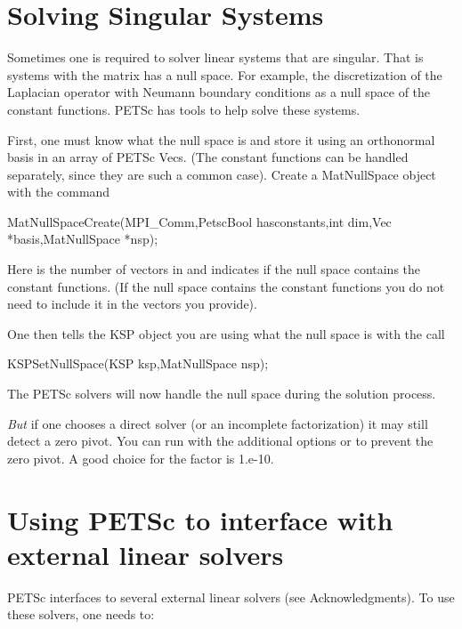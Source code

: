 \section{Solving Singular Systems}
\label{sec_singular}

Sometimes one is required to solver linear systems that are singular. 
That is systems with the matrix has a null space. For example, the 
discretization of the Laplacian operator with Neumann boundary conditions
as a null space of the constant functions. PETSc has tools to help
solve these systems.

First, one must know what the null space is and store it using an orthonormal basis
in an array of PETSc Vecs. (The constant functions can be handled separately, since
they are such a common case). Create a MatNullSpace object with the command
\begin{tabbing}
MatNullSpaceCreate(MPI\_Comm,PetscBool  hasconstants,int dim,Vec *basis,MatNullSpace *nsp);
\end{tabbing}
Here  is the number of vectors in  and  indicates
if the null space contains the constant functions. (If the null space contains the constant
functions you do not need to include it in the  vectors you provide).

One then tells the KSP object you are using what the null space is with the call
\begin{tabbing}
KSPSetNullSpace(KSP ksp,MatNullSpace nsp);
\end{tabbing}
The PETSc solvers will now handle the null space during the solution process.

\emph{But} if one chooses a direct solver (or an incomplete factorization)
it may still detect a zero pivot. 
You can run with the additional options 
 or   to
prevent the zero pivot. A good choice for the  factor is 1.e-10.

\section{Using PETSc to interface with external linear solvers}
\label{sec_externalsol}

PETSc interfaces to several external linear solvers (see Acknowledgments).
To use these solvers, one needs to:

